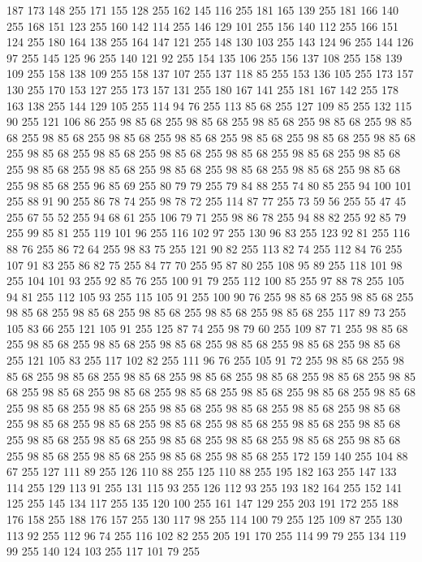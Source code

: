 187 173 148 255 171 155 128 255 162 145 116 255 181 165 139 255 181 166 140 255 168 151 123 255 160 142 114 255 146 129 101 255 156 140 112 255 166 151 124 255 180 164 138 255 164 147 121 255 148 130 103 255 143 124 96 255 144 126 97 255 145 125 96 255 140 121 92 255 154 135 106 255 156 137 108 255 158 139 109 255 158 138 109 255 158 137 107 255 137 118 85 255 153 136 105 255 173 157 130 255 170 153 127 255 173 157 131 255 180 167 141 255 181 167 142 255 178 163 138 255 144 129 105 255 114 94 76 255 113 85 68 255 127 109 85 255 132 115 90 255 121 106 86 255 98 85 68 255 98 85 68 255 98 85 68 255 98 85 68 255 98 85 68 255 98 85 68 255 98 85 68 255 98 85 68 255 98 85 68 255 98 85 68 255 98 85 68 255 98 85 68 255 98 85 68 255 98 85 68 255 98 85 68 255 98 85 68 255 98 85 68 255 98 85 68 255 98 85 68 255 98 85 68 255 98 85 68 255 98 85 68 255 98 85 68 255 98 85 68 255 96 85 69 255 80 79 79 255 79 84 88 255 74 80 85 255
94 100 101 255 88 91 90 255 86 78 74 255 98 78 72 255 114 87 77 255 73 59 56 255 55 47 45 255 67 55 52 255 94 68 61 255 106 79 71 255 98 86 78 255 94 88 82 255 92 85 79 255 99 85 81 255 119 101 96 255 116 102 97 255 130 96 83 255 123 92 81 255 116 88 76 255 86 72 64 255 98 83 75 255 121 90 82 255 113 82 74 255 112 84 76 255 107 91 83 255 86 82 75 255 84 77 70 255 95 87 80 255 108 95 89 255 118 101 98 255 104 101 93 255 92 85 76 255 100 91 79 255 112 100 85 255 97 88 78 255 105 94 81 255 112 105 93 255 115 105 91 255 100 90 76 255 98 85 68 255 98 85 68 255 98 85 68 255 98 85 68 255 98 85 68 255 98 85 68 255 98 85 68 255 117 89 73 255 105 83 66 255 121 105 91 255 125 87 74 255 98 79 60 255 109 87 71 255 98 85 68 255 98 85 68 255 98 85 68 255 98 85 68 255 98 85 68 255 98 85 68 255 98 85 68 255 121 105 83 255 117 102 82 255 111 96 76 255 105 91 72 255 98 85 68 255
98 85 68 255 98 85 68 255 98 85 68 255 98 85 68 255 98 85 68 255 98 85 68 255 98 85 68 255 98 85 68 255 98 85 68 255 98 85 68 255 98 85 68 255 98 85 68 255 98 85 68 255 98 85 68 255 98 85 68 255 98 85 68 255 98 85 68 255 98 85 68 255 98 85 68 255 98 85 68 255 98 85 68 255 98 85 68 255 98 85 68 255 98 85 68 255 98 85 68 255 98 85 68 255 98 85 68 255 98 85 68 255 98 85 68 255 98 85 68 255 98 85 68 255 98 85 68 255 98 85 68 255 98 85 68 255 98 85 68 255 172 159 140 255 104 88 67 255 127 111 89 255 126 110 88 255 125 110 88 255 195 182 163 255 147 133 114 255 129 113 91 255 131 115 93 255 126 112 93 255 193 182 164 255 152 141 125 255 145 134 117 255 135 120 100 255 161 147 129 255 203 191 172 255 188 176 158 255 188 176 157 255 130 117 98 255 114 100 79 255 125 109 87 255 130 113 92 255 112 96 74 255 116 102 82 255 205 191 170 255 114 99 79 255 134 119 99 255 140 124 103 255 117 101 79 255
